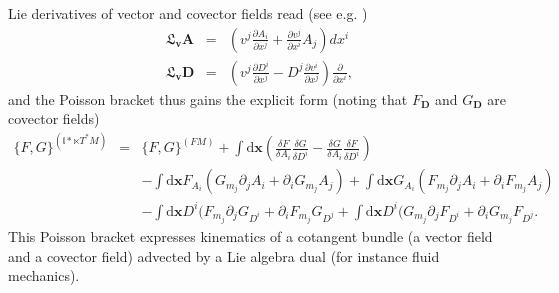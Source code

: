 \documentclass[
10pt, %
a4paper, %
oneside, %
headinclude,footinclude, %
BCOR5mm, %
]{scrartcl}
\newcommand{\xx}{\mathbf{x}}
\newcommand{\dx}{\mathrm{d}\xx}
\newcommand{\vv}{\mathbf{v}}
\renewcommand{\AA}{\mathbf{A}}
\newcommand{\DD}{\mathbf{D}}
\newcommand{\Lie}{\mathfrak{L}}
\newcommand{\LA}{\mathfrak{l}}
\begin{document}
 Lie derivatives of vector and covector fields read (see e.g. \cite{Fecko})
 \begin{subequations}
\begin{eqnarray}
\Lie_\vv \AA &=& \left(v^j \frac{\partial A_i}{\partial x^j} + \frac{\partial v^j}{\partial x^i}A_j\right) dx^i\\
\Lie_\vv \DD &=& \left(v^j \frac{\partial D^i}{\partial x^j} - D^j\frac{\partial v^i}{\partial x^j}\right)\frac{\partial}{\partial x^i},
\end{eqnarray}
\end{subequations}
and the Poisson bracket thus gains the explicit form (noting that $F_\DD$ and $G_\DD$ are covector fields)
\begin{eqnarray}
	\{F,G\}^{(\LA*\ltimes T^*M)} &=& \{F,G\}^{(FM)} 
    + \int\dx \left(\frac{\delta F}{\delta A_i}\frac{\delta G}{\delta D^i}-\frac{\delta G}{\delta A_i}\frac{\delta F}{\delta D^i}\right)\\
	&&-\int\dx  F_{A_i} (G_{m_j} \partial_j A_i + \partial_i G_{m_j}A_j)
	+\int\dx  G_{A_i} (F_{m_j} \partial_j A_i + \partial_i F_{m_j}A_j)\nonumber\\
	&&- \int\dx D^i(F_{m_j} \partial_j G_{D^i} + \partial_i F_{m_j} G_{D^j}
   + \int\dx D^i(G_{m_j} \partial_j F_{D^i} + \partial_i G_{m_j} F_{D^j}.\nonumber
\end{eqnarray}
 This Poisson bracket expresses kinematics of a cotangent bundle (a vector field and a covector field) advected by a Lie algebra dual (for instance fluid mechanics).
 
\end{document}
